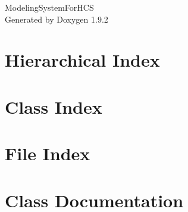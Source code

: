 \documentclass[twoside]{book}
\newcommand{\+}{\discretionary{\mbox{\scriptsize$\hookleftarrow$}}{}{}}
\newcommand{\clearemptydoublepage}{%
    \newpage{\pagestyle{empty}\cleardoublepage}%
  }
\begin{document}
  \raggedbottom
    \hypersetup{pageanchor=false,
                bookmarksnumbered=true,
                pdfencoding=unicode
               }
  \begin{titlepage}
  \vspace*{7cm}
  \begin{center}%
  {\Large Modeling\+System\+For\+HCS}\\
  \vspace*{1cm}
  {\large Generated by Doxygen 1.9.2}\\
  \end{center}
  \end{titlepage}
  \clearemptydoublepage
  \tableofcontents
  \clearemptydoublepage
  \hypersetup{pageanchor=true}
\chapter{Hierarchical Index}

\chapter{Class Index}

\chapter{File Index}

\chapter{Class Documentation}





















\end{document}
